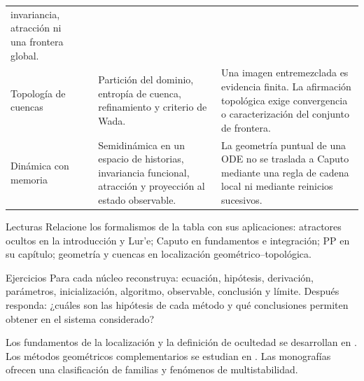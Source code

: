 \begin{longtable}{@{}L{0.16\textwidth}L{0.22\textwidth}L{0.28\textwidth}L{0.26\textwidth}@{}}
invariancia, atracción ni una frontera global. \\
Topología de cuencas
& \cite{DazaEtAl2016BasinEntropy,DazaEtAl2015Wada}
& Partición del dominio, entropía de cuenca, refinamiento y criterio de Wada.
& Una imagen entremezclada es evidencia finita. La afirmación topológica exige
convergencia o caracterización del conjunto de frontera. \\
Dinámica con memoria
& \cite{DoanKloeden2024Attractors}
& Semidinámica en un espacio de historias, invariancia funcional, atracción y
proyección al estado observable.
& La geometría puntual de una ODE no se traslada a Caputo mediante una regla de
cadena local ni mediante reinicios sucesivos. \\
\bottomrule
\end{longtable}

\ifHAFOPedagogy
\begin{bloqueestudio}{Lecturas}
Relacione los formalismos de la tabla con sus aplicaciones: atractores
ocultos en la introducción y Lur'e; Caputo en fundamentos e integración; PP en
su capítulo; geometría y cuencas en localización geométrico--topológica.
\end{bloqueestudio}

\begin{bloqueestudio}{Ejercicios}
Para cada núcleo reconstruya: ecuación, hipótesis, derivación, parámetros,
inicialización, algoritmo, observable, conclusión y límite. Después responda:
¿cuáles son las hipótesis de cada método y qué conclusiones permiten
obtener en el sistema considerado?
\end{bloqueestudio}
\fi

Los fundamentos de la localización y la definición de ocultedad se desarrollan
en \cite{LeonovKuznetsovVagaitsev2011,Leonov2013HiddenAttractors,Danca2017,KuznetsovEtAl2017,Wu2023ArctanChua}.
Los métodos geométricos complementarios se estudian en
\cite{DudkowskiPrasadKapitaniak2017,GuanXie2021Connecting,GodaraEtAl2018CriticalSurfaces}.
Las monografías \cite{PhamEtAl2018HiddenAttractors,PhamVolosKapitaniak2017Systems,WangKuznetsovChen2021Multistability}
ofrecen una clasificación de familias y fenómenos de multistabilidad.
